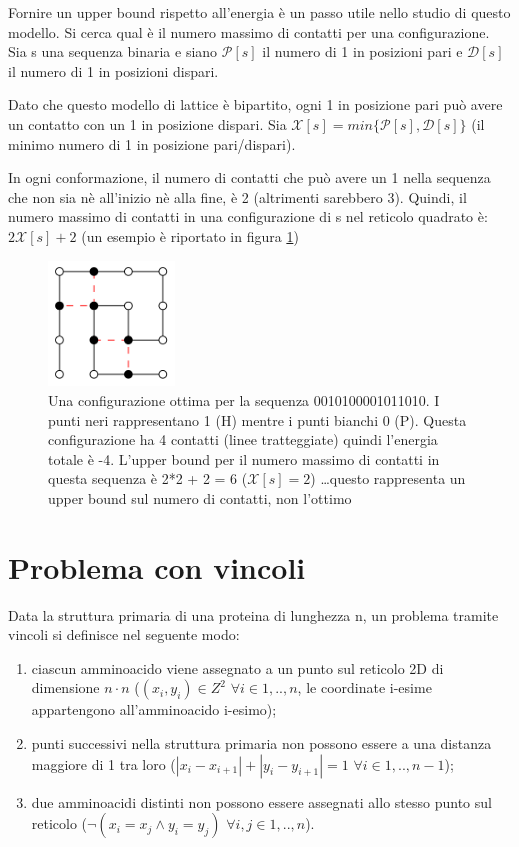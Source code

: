 \documentclass[conference]{IEEEtran}
\newcommand{\abs}[1]{\left|#1\right|}
\begin{document}
Fornire un upper bound rispetto all'energia è un passo utile nello studio di questo modello. Si cerca qual è il numero massimo di contatti per una configurazione. Sia s una sequenza binaria e siano $\mathcal{P}[s]$ il numero di 1 in posizioni pari e $\mathcal{D}[s]$ il numero di 1 in posizioni dispari.

Dato che questo modello di lattice è bipartito, ogni 1 in posizione pari può avere un contatto con un 1 in posizione dispari. Sia $\mathcal{X}[s] = min\{\mathcal{P}[s], \mathcal{D}[s]\}$ (il minimo numero di 1 in posizione pari/dispari).

In ogni conformazione, il numero di contatti che può avere un 1 nella sequenza che non sia nè all'inizio nè alla fine, è 2 (altrimenti sarebbero 3). Quindi, il numero massimo di contatti in una configurazione di s nel reticolo quadrato è: $2 \mathcal{X}[s] + 2$ (un esempio è riportato in figura \ref{fig:optConfig})

\begin{figure}[h]
\centering
\includegraphics[width=0.3\textwidth]{figure/optConfig}
\caption{Una configurazione ottima per la sequenza 0010100001011010. I punti neri rappresentano 1 (H) mentre i punti bianchi 0 (P). Questa configurazione ha 4 contatti (linee tratteggiate) quindi l'energia totale è -4. L'upper bound per il numero massimo di contatti in questa sequenza è 2*2 + 2 = 6 ($\mathcal{X}[s] = 2$) \dots questo rappresenta un upper bound sul numero di contatti, non l'ottimo}
\label{fig:optConfig}
\end{figure}

\section{Problema con vincoli}

Data la struttura primaria di una proteina di lunghezza n, un problema tramite vincoli si definisce nel seguente modo:

\begin{enumerate}
 \item ciascun amminoacido viene assegnato a un punto sul reticolo 2D di dimensione $n \cdot n$ ($(x_i, y_i) \in Z^2$ $\forall i \in 1,..,n$, le coordinate i-esime appartengono all'amminoacido i-esimo);
 \item punti successivi nella struttura primaria non possono essere a una distanza maggiore di 1 tra loro ($\abs{x_i - x_{i+1}} + \abs{y_i - y_{i+1}} = 1 $ $\forall i \in 1,..,n-1$);
 \item due amminoacidi distinti non possono essere assegnati allo stesso punto sul reticolo ($ \neg (x_i = x_j \land y_i = y_j)$ $\forall i,j \in 1,..,n$).
\end{enumerate}
\end{document}
